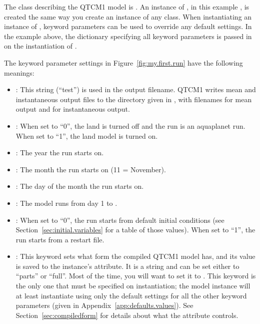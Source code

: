 The class describing the QTCM1 model is .  An instance
of , in this example , is created the same
way you create an instance of any class.  When instantiating an
instance of , keyword parameters can be used to override
any default settings.  In the example above, the dictionary
 specifying all keyword parameters is passed in on the
instantiation of .

The keyword parameter settings in
Figure~\ref{fig:my.first.run} have the following meanings:
\begin{itemize}
\item {}:  This string (``test'') is used in the
	output filename.  QTCM1 writes mean and instantaneous
	output files to the directory given in ,
	with filenames 
	 for mean output and
	 for instantaneous output.

\item {}: When set to ``0'', the land is turned off and
	the run is an aquaplanet run.  When set to ``1'', the land
	model is turned on.

\item {}:  The year the run starts on.

\item {}:  The month the run starts on (11 = November).

\item {}: The day of the month the run starts on.

\item {}:  The model runs from day 1 to .

\item {}:  When set to ``0'', the run starts from
	default initial conditions
	(see Section~\ref{sec:initial.variables} for a table of
	those values).
	When set to ``1'', the run starts from a restart file.

\item {}:  This keyword sets what form the
	compiled QTCM1 model has, and its value is saved to
	the instance's  attribute.
	It is a string and can be set either to
	``parts'' or ``full''.  Most of the time, you will want
	to set it to .
	This keyword is the only one
	that must be specified on instantiation; the model instance
	will at least instantiate
	using only the default settings for all the other keyword
	parameters (given in Appendix~\ref{app:defaults.values}).
	See Section~\ref{sec:compiledform} for details about
	what the  attribute controls.
\end{itemize}


